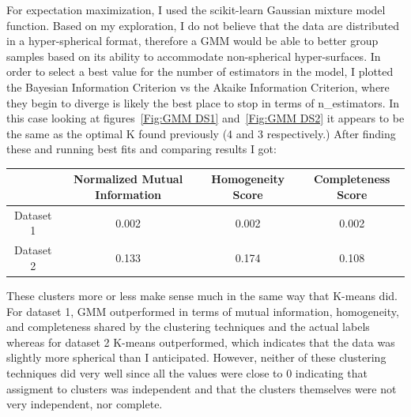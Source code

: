 For expectation maximization, I used the scikit-learn Gaussian mixture model function.
Based on my exploration, I do not believe that the data are distributed in a hyper-spherical format, therefore a GMM would
be able to better group samples based on its ability to accommodate non-spherical hyper-surfaces.
In order to select a best value for the number of estimators in the model, I plotted the Bayesian Information Criterion
vs the Akaike Information Criterion, where they begin to diverge is likely the best place to stop in terms of n\_estimators.
In this case looking at figures~\ref{Fig:GMM DS1} and~\ref{Fig:GMM DS2} it appears to be the same as the optimal K found
previously (4 and 3 respectively.) After finding these and running best fits and comparing results I got:
\begin{center}
    \begin{tabular}{|c| c | c | c |}
        \hline
        & Normalized Mutual Information & Homogeneity Score & Completeness Score \\
        \hline
        \hline
        Dataset 1 & 0.002                         & 0.002             & 0.002              \\
        \hline
        Dataset 2 & 0.133                         & 0.174             & 0.108              \\
        \hline
    \end{tabular}
\end{center}
These clusters more or less make sense much in the same way that K-means did.
For dataset 1, GMM outperformed in terms of mutual information, homogeneity, and completeness shared by the clustering techniques and the actual labels
whereas for dataset 2 K-means outperformed, which indicates that the data was slightly more spherical than I anticipated.
However, neither of these clustering techniques did very well since all the values were close to 0 indicating that assigment
to clusters was independent and that the clusters themselves were not very independent, nor complete.
